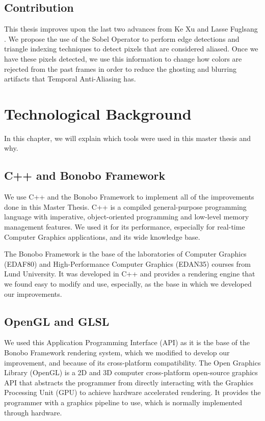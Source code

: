 \documentclass{cslthse-msc}
\begin{document}
\section{Contribution}
This thesis improves upon the last two advances from Ke Xu and Lasse Fuglsang \cite{Fuglsand2016, XU2016}. We propose the use of the Sobel Operator to perform edge detections and triangle indexing techniques to detect pixels that are considered aliased. Once we have these pixels detected, we use this information to change how colors are rejected from the past frames in order to reduce the ghosting and blurring artifacts that Temporal Anti-Aliasing has.

\chapter{Technological Background}
In this chapter, we will explain which tools were used in this master thesis and why.
\section{C++ and Bonobo Framework}
We use C++ and the Bonobo Framework to implement all of the improvements done in this Master Thesis. C++ is a compiled general-purpose programming language with imperative, object-oriented programming and low-level memory management features. We used it for its performance, especially for real-time Computer Graphics applications, and its wide knowledge base.

The Bonobo Framework is the base of the laboratories of Computer Graphics (EDAF80) and High-Performance Computer Graphics (EDAN35) courses from Lund University. It was developed in C++ and provides a rendering engine that we found easy to modify and use, especially, as the base in which we developed our improvements. 


\section{OpenGL and GLSL}
We used this Application Programming Interface (API) as it is the base of the Bonobo Framework rendering system, which we modified to develop our improvement, and because of its cross-platform compatibility. The Open Graphics Library (OpenGL) is a 2D and 3D computer cross-platform open-source graphics API that abstracts the programmer from directly interacting with the Graphics Processing Unit (GPU) to achieve hardware accelerated rendering. It provides the programmer with a graphics pipeline to use, which is normally implemented through hardware. 
\end{document}
